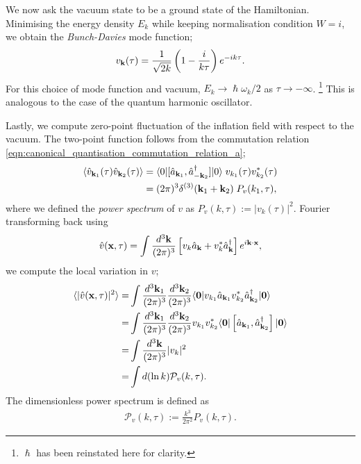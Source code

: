 We now ask the vacuum state to be a ground state of the Hamiltonian. Minimising the energy density $E_k$ while keeping normalisation condition $W=i$, we obtain the \textit{Bunch-Davies} mode function;
\begin{align}
	v_\mathbf{k}(\tau) = \frac{1}{\sqrt{2k}} \left( 1 - \frac{i}{k\tau} \right) e^{-ik\tau}. \label{eqn:bunch_davis_mode_function}
\end{align}
For this choice of mode function and vacuum, $E_k \rightarrow \hslash\omega_k/2$ as $\tau \rightarrow -\infty$. \footnote{$\hslash$ has been reinstated here for clarity.} This is analogous to the case of the quantum harmonic oscillator.

Lastly, we compute zero-point fluctuation of the inflation field with respect to the vacuum. The two-point function follows from the commutation relation \eqref{eqn:canonical_quantisation_commutation_relation_a};
\begin{align}
	\langle \hat{v}_{\mathbf{k}_1} (\tau) \hat{v}_{\mathbf{k}_2} (\tau) \rangle &= \langle 0| [\hat{a}_{\mathbf{k}_1}, \hat{a}^\dagger_{-\mathbf{k}_2}] |0 \rangle \; v_{k_1}(\tau) v^*_{k_2}(\tau) \\
	&= (2\pi)^3 \delta^{(3)} (\mathbf{k}_1 + \mathbf{k}_2 ) \; P_{v}(k_1,\tau),   \label{eqn:single_field_inflation_power_spectrum}
\end{align}
where we defined the \textit{power spectrum} of $v$ as $P_v(k,\tau) := |v_k(\tau)|^2$. Fourier transforming back using
\begin{align}
	\hat{v}(\mathbf{x}, \tau) = \int \frac{d^3\mathbf{k}}{(2\pi)^3} \left[ v_k \hat{a}_\mathbf{k} + v^*_k \hat{a}^\dagger_\mathbf{k} \right] e^{i\mathbf{k} \cdot \mathbf{x}},
\end{align}
we compute the local variation in $v$;
\begin{align}
	\langle | \hat{v}(\mathbf{x}, \tau) |^2 \rangle =& \int \frac{d^3\mathbf{k}_1}{(2\pi)^3} \frac{d^3\mathbf{k}_2}{(2\pi)^3} \langle \mathbf{0} | v_{k_1} \hat{a}_{\mathbf{k}_1} v^*_{k_2} \hat{a}^\dagger_{\mathbf{k}_2} | \mathbf{0} \rangle 	\\
	=& \int \frac{d^3\mathbf{k}_1}{(2\pi)^3} \frac{d^3\mathbf{k}_2}{(2\pi)^3} v_{k_1} v^*_{k_2} \langle \mathbf{0} | \left[ \hat{a}_{\mathbf{k}_1}, \hat{a}^\dagger_{\mathbf{k}_2} \right] | \mathbf{0} \rangle	 \\
	=& \int \frac{d^3\mathbf{k}}{(2\pi)^3} |v_k|^2	\\
	=& \int d(\ln k) \mathcal{P}_v (k,\tau).
\end{align}
The dimensionless power spectrum is defined as
\begin{align}
	\mathcal{P}_v (k,\tau) := \frac{k^3}{2\pi^2} P_v(k,\tau).
\end{align}
